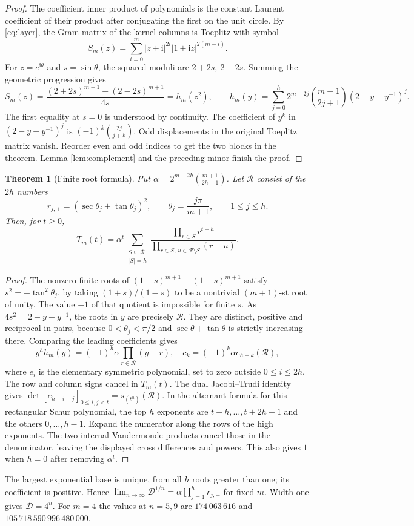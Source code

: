 \documentclass[11pt,letterpaper]{article}
\newtheorem{theorem}{Theorem}[section]
\newcommand{\ii}{\mathrm i}
\newcommand{\Gram}{\mathcal D}
\begin{document}
\begin{proof}
\clearpage
The coefficient inner product of polynomials is the constant Laurent coefficient of their product after conjugating the first on the unit circle. By \eqref{eq:layer}, the Gram matrix of the kernel columns is Toeplitz with symbol
\[
 S_m(z)=\sum_{i=0}^m |z+\ii|^{2i}|1+\ii z|^{2(m-i)}.
\]
For \(z=e^{\ii\theta}\) and \(s=\sin\theta\), the squared moduli are \(2+2s,\ 2-2s\). Summing the geometric progression gives
\[
 S_m(z)=\frac{(2+2s)^{m+1}-(2-2s)^{m+1}}{4s}
   =h_m(z^2),\qquad
 h_m(y)=\sum_{j=0}^h2^{m-2j}\binom{m+1}{2j+1}(2-y-y^{-1})^j .
\]
The first equality at \(s=0\) is understood by continuity. The coefficient of \(y^k\) in \((2-y-y^{-1})^j\) is \((-1)^k\binom{2j}{j+k}\). Odd displacements in the original Toeplitz matrix vanish. Reorder even and odd indices to get the two blocks in the theorem. Lemma \ref{lem:complement} and the preceding minor finish the proof.
\end{proof}

\begin{theorem}[Finite root formula]\label{th:roots}
Put \(\alpha=2^{m-2h}\binom{m+1}{2h+1}\). Let \(\mathcal R\) consist of the \(2h\) numbers
\[
 r_{j,\pm}=(\sec\theta_j\pm\tan\theta_j)^2,\qquad
 \theta_j=\frac{j\pi}{m+1},\qquad 1\le j\le h.
\]
Then, for \(t\ge0\),
\[
 T_m(t)=\alpha^t\sum_{\substack{S\subseteq\mathcal R\\|S|=h}}
 \frac{\prod_{r\in S}r^{t+h}}{\prod_{r\in S,\,u\in\mathcal R\setminus S}(r-u)}.
\]
\end{theorem}
\begin{proof}
The nonzero finite roots of \((1+s)^{m+1}-(1-s)^{m+1}\) satisfy \(s^2=-\tan^2\theta_j\), by taking \((1+s)/(1-s)\) to be a nontrivial \((m+1)\)-st root of unity. The value \(-1\) of that quotient is impossible for finite \(s\). As \(4s^2=2-y-y^{-1}\), the roots in \(y\) are precisely \(\mathcal R\). They are distinct, positive and reciprocal in pairs, because \(0<\theta_j<\pi/2\) and \(\sec\theta+\tan\theta\) is strictly increasing there. Comparing the leading coefficients gives
\[
 y^h h_m(y)=(-1)^h\alpha\prod_{r\in\mathcal R}(y-r),\quad
 c_k=(-1)^k\alpha e_{h-k}(\mathcal R),
\]
where \(e_i\) is the elementary symmetric polynomial, set to zero outside \(0\le i\le2h\). The row and column signs cancel in \(T_m(t)\). The dual Jacobi--Trudi identity \cite[Ch.~I, \S3]{macdonald} gives
\(\det[e_{h-i+j}]_{0\le i,j<t}=s_{(t^h)}(\mathcal R)\).
In the alternant formula for this rectangular Schur polynomial, the top \(h\) exponents are \(t+h,\ldots,t+2h-1\) and the others \(0,\ldots,h-1\). Expand the numerator along the rows of the high exponents. The two internal Vandermonde products cancel those in the denominator, leaving the displayed cross differences and powers. This also gives \(1\) when \(h=0\) after removing \(\alpha^t\).
\end{proof}
The largest exponential base is unique, from all \(h\) roots greater than one; its coefficient is positive. Hence \(\lim_{n\to\infty}\Gram^{1/n}=\alpha\prod_{j=1}^h r_{j,+}\) for fixed \(m\). Width one gives \(\Gram=4^n\). For \(m=4\) the values at \(n=5,9\) are \(174\,063\,616\) and \(105\,718\,590\,996\,480\,000\).
\end{document}
